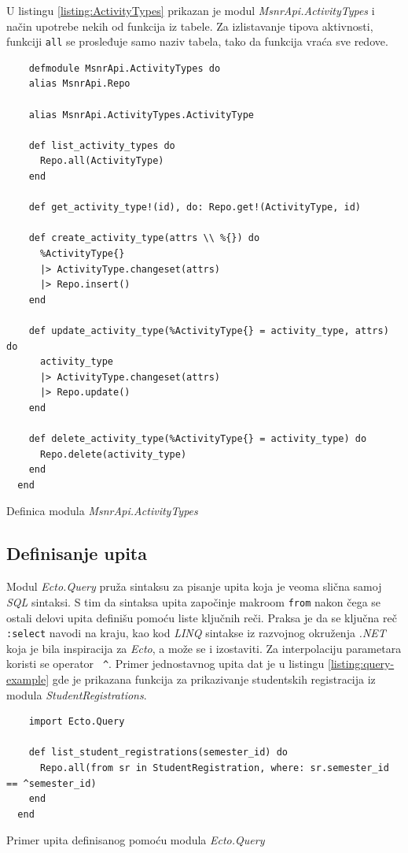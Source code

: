 \documentclass[12pt,oneside]{memoir}
\begin{document}
U listingu \ref{listing:ActivityTypes} prikazan je modul
\emph{MsnrApi.ActivityTypes} i način upotrebe nekih od funkcija iz tabele. Za izlistavanje tipova aktivnosti,
funkciji \texttt{all} se prosleđuje samo naziv tabela, tako da funkcija vraća sve redove.
\begin{listing}[!h]
  \begin{verbatim}
    defmodule MsnrApi.ActivityTypes do
    alias MsnrApi.Repo
  
    alias MsnrApi.ActivityTypes.ActivityType
  
    def list_activity_types do
      Repo.all(ActivityType)
    end
  
    def get_activity_type!(id), do: Repo.get!(ActivityType, id)
  
    def create_activity_type(attrs \\ %{}) do
      %ActivityType{}
      |> ActivityType.changeset(attrs)
      |> Repo.insert()
    end
  
    def update_activity_type(%ActivityType{} = activity_type, attrs) do
      activity_type
      |> ActivityType.changeset(attrs)
      |> Repo.update()
    end
  
    def delete_activity_type(%ActivityType{} = activity_type) do
      Repo.delete(activity_type)
    end
  end
\end{verbatim}
\caption{Definica modula \emph{MsnrApi.ActivityTypes}}
\label{listing:ActivityTypes}
\end{listing}

\subsection{Definisanje upita}
Modul \emph{Ecto.Query} pruža sintaksu za pisanje upita koja je veoma slična samoj \emph{SQL} sintaksi. 
S tim da sintaksa upita započinje makroom \texttt{from} nakon čega se ostali delovi upita definišu pomoću liste ključnih reči.
Praksa je da se ključna reč \texttt{:select} navodi na kraju, kao kod \emph{LINQ} \cite{linq} sintakse iz razvojnog okruženja \emph{.NET}
koja je bila inspiracija za \emph{Ecto}, a može se i izostaviti. Za interpolaciju parametara koristi se operator \texttt{ \^{}}.
Primer jednostavnog upita dat je u listingu \ref{listing:query-example} gde je prikazana funkcija za prikazivanje studentskih
registracija iz modula \emph{StudentRegistrations}.
\begin{listing}[h]
  \begin{verbatim}
    import Ecto.Query

    def list_student_registrations(semester_id) do
      Repo.all(from sr in StudentRegistration, where: sr.semester_id == ^semester_id)
    end
  end
  \end{verbatim}
\caption{Primer upita definisanog pomoću modula \emph{Ecto.Query}}
\label{listing:query-example}
\end{listing}
\end{document}
